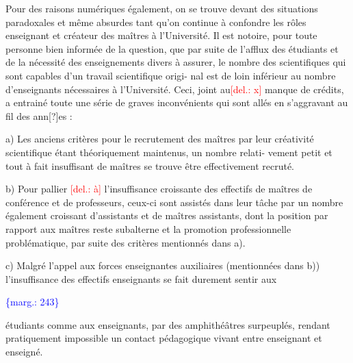 \documentclass[11pt]{article}
\newcommand{\scanpage}[1]{\par\bigskip\noindent{\small\sffamily[scan #1]}\par}
\newcommand{\mspage}[1]{{\small\sffamily[p.\,#1]}}
\let\over\relax
\newcommand{\over}[2]{\textcolor{gray}{#1}\textcolor{blue}{\ensuremath{^{\!\nearrow}}#2}}
\newcommand{\margin}[1]{\textcolor{blue}{\{\textsf{marg.:} #1\}}}
\newcommand{\deleted}[1]{\textcolor{red}{[\textsf{del.:} #1]}}
\newcommand{\unsure}[1]{[#1?]}
\begin{document}
Pour des raisons numériques également, on se trouve devant des
situations paradoxales et même absurdes tant qu'on continue à confondre
les rôles enseignant et créateur des maîtres à l'Université. Il est notoire,
pour toute personne bien informée de la question, que par suite de l'afflux
des étudiants et de la nécessité des enseignements divers à assurer, le
nombre des scientifiques qui sont capables d'un travail scientifique origi-%
nal est de loin inférieur au nombre d'enseignants nécessaires à l'Université.
Ceci, joint au\deleted{x} manque de crédits, a entrainé toute une série de graves
inconvénients qui sont allés en s'aggravant au fil des ann\unsure{\over{e}{é}}es :

a) Les anciens critères pour le recrutement des maîtres par leur
créativité scientifique étant théoriquement maintenus, un nombre relati-%
vement petit et tout à fait insuffisant de maîtres se trouve être effectivement
recruté.

b) Pour pallier \deleted{à} l'insuffisance croissante des effectifs de
maîtres de conférence et de professeurs, ceux-ci sont assistés dans leur
tâche par un nombre également croissant d'assistants et de maîtres assistants,
dont la position par rapport aux maîtres reste subalterne et la promotion
professionnelle problématique, par suite des critères mentionnés dans a).

c) Malgré l'appel aux forces enseignantes auxiliaires (mentionnées
dans b)) l'insuffisance des effectifs enseignants se fait durement sentir aux

\margin{243}

\clearpage
\scanpage{119/244}
\mspage{4}

étudiants comme aux enseignants, par des amphithéâtres surpeuplés, rendant
pratiquement impossible un contact pédagogique vivant entre enseignant et
enseigné.
\end{document}
